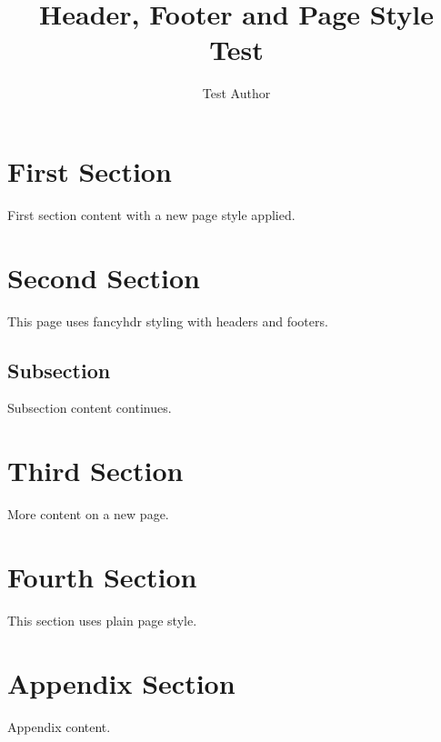 \documentclass{article}
\title{Header, Footer and Page Style Test}
\author{Test Author}
\begin{document}
\maketitle

\thispagestyle{empty}

\section{First Section}

First section content with a new page style applied.

\pagestyle{fancy}

\section{Second Section}

This page uses fancyhdr styling with headers and footers.

\subsection{Subsection}

Subsection content continues.

\section{Third Section}

More content on a new page.

\pagestyle{plain}

\section{Fourth Section}

This section uses plain page style.

\appendix
\section{Appendix Section}

Appendix content.
\end{document}
